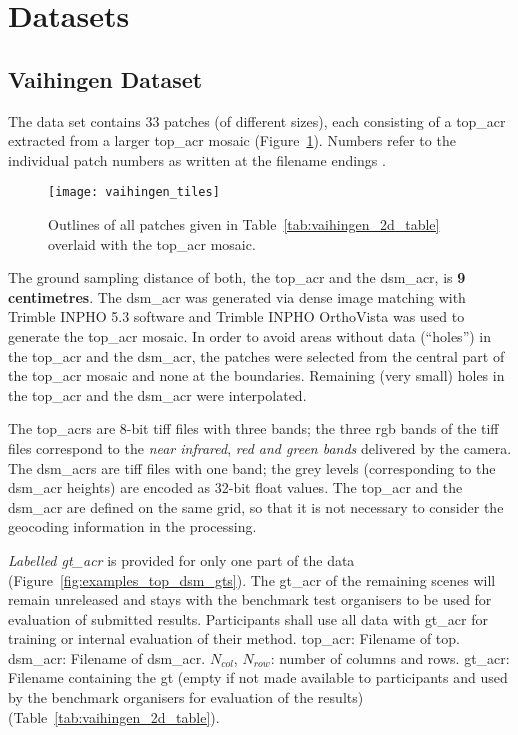 \section{Datasets}
\subsection{Vaihingen Dataset}
The data set contains 33 patches (of different sizes), each consisting of a
\acrfull{top_acr} extracted from a larger \acrshort{top_acr} mosaic
(Figure~\ref{fig:vaihingen_tiles}). Numbers refer to the individual patch
numbers as written at the filename endings \cite{vaihingen_isprs}.
\begin{figure}
    \centering
    \texttt{[image: vaihingen\_tiles]}
    \caption{Outlines of all patches given in Table~\ref{tab:vaihingen_2d_table}
    overlaid with the \acrshort{top_acr} mosaic.}
    \label{fig:vaihingen_tiles}
\end{figure}


The ground sampling distance of both, the \acrshort{top_acr} and the
\acrshort{dsm_acr}, is \textbf{9 centimetres}. The \acrshort{dsm_acr} was
generated via dense image matching with Trimble INPHO 5.3 software and Trimble
INPHO OrthoVista was used to generate the \acrshort{top_acr} mosaic. In order to
avoid areas without data (``holes'') in the \acrshort{top_acr} and the
\acrshort{dsm_acr}, the patches were selected from the central part of the
\acrshort{top_acr} mosaic and none at the boundaries. Remaining (very small)
holes in the \acrshort{top_acr} and the \acrshort{dsm_acr} were interpolated.


The \acrshort{top_acr}s are 8-bit \acrfull{tiff} files with three bands; the
three \acrshort{rgb} bands of the \acrshort{tiff} files correspond to the
\emph{near infrared}, \emph{red and green bands} delivered by the camera. The
\acrshort{dsm_acr}s are \acrshort{tiff} files with one band; the grey levels
(corresponding to the \acrshort{dsm_acr} heights) are encoded as 32-bit float
values. The \acrshort{top_acr} and the \acrshort{dsm_acr} are defined on the
same grid, so that it is not necessary to consider the geocoding information in
the processing.


\emph{Labelled \acrfull{gt_acr}} is provided for only one part of the data
(Figure~\ref{fig:examples_top_dsm_gts}). The \acrshort{gt_acr} of the remaining
scenes will remain unreleased and stays with the benchmark test organisers to be
used for evaluation of submitted results. Participants shall use all data with
\acrshort{gt_acr} for training or internal evaluation of their method.
\acrshort{top_acr}: Filename of \gls{top}. \acrshort{dsm_acr}: Filename
of \acrshort{dsm_acr}. $N_{col}$, $N_{row}$: number of columns and rows.
\acrshort{gt_acr}: Filename containing the \gls{gt} (empty if not made
available to participants and used by the benchmark organisers for evaluation
of the results) (Table~\ref{tab:vaihingen_2d_table}).

